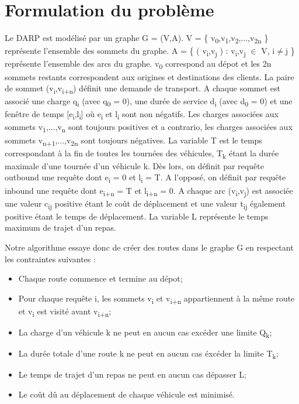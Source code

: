 \documentclass[10pt,a4paper]{report}
\begin{document}
\section*{Formulation du problème}
Le DARP est modélisé par un graphe G = (V,A). V = \{ v\textsubscript{0},v\textsubscript{1},v\textsubscript{2},...,v\textsubscript{2n} \} représente l'ensemble des sommets du graphe. 
A = \{ ( v\textsubscript{i},v\textsubscript{j} ) : v\textsubscript{i},v\textsubscript{j} $\in$ V, i$\neq $j \} représente l'ensemble des arcs du graphe.  v\textsubscript{0} correspond au dépot et les 2n sommets restants correspondent aux origines et destinations des clients. La paire de sommet (v\textsubscript{i},v\textsubscript{i+n}) définit une demande de transport.  
A chaque sommet est associé une charge q\textsubscript{i} (avec q\textsubscript{0} = 0), une durée de service d\textsubscript{i} (avec d\textsubscript{0} = 0)  et une fenêtre de temps [e\textsubscript{i},l\textsubscript{i}] où e\textsubscript{i} et l\textsubscript{i} sont non négatifs.
 Les charges associées aux sommets v\textsubscript{1},...,v\textsubscript{n} sont toujours positives et a contrario, les charges associées aux sommets v\textsubscript{n+1},...,v\textsubscript{2n} sont toujours négatives. 
 La variable T est le temps correspondant à la fin de toutes les tournées des véhicules, T\textsubscript{k} étant la durée maximale d'une tournée d'un véhicule k. Dès lors, on définit par requête outbound une requête dont e\textsubscript{i} = 0 et l\textsubscript{i} = T. A l'opposé, on définit par requête inbound une requête dont e\textsubscript{i+n} = T et l\textsubscript{i+n} = 0. 
A chaque arc (v\textsubscript{i},v\textsubscript{j}) est associée une valeur c\textsubscript{ij} positive étant le coût de déplacement et une valeur t\textsubscript{ij} également positive étant le temps de déplacement.
La variable L  représente le temps maximum de trajet d'un repas.
    
Notre algorithme essaye donc de créer des routes dans le graphe G en respectant les contraintes suivantes :
\begin{itemize}
\item Chaque route commence et termine au dépot;
\item Pour chaque requête i, les sommets v\textsubscript{i} et v\textsubscript{i+n} appartiennent à la même route et v\textsubscript{i} est visité avant v\textsubscript{i+n};
\item La charge d'un véhicule k ne peut en aucun cas excéder une limite Q\textsubscript{k};
\item La durée totale d'une route k ne peut en aucun cas éxcéder la limite T\textsubscript{k};
\item Le temps de trajet d'un repas ne peut en aucun cas dépasser L;
\item Le coût dû au déplacement de chaque véhicule est minimisé. 
\end{itemize}
\end{document}
